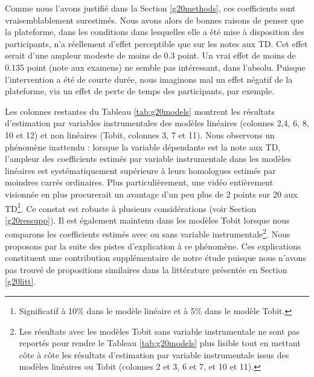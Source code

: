 \documentclass[
]{book}
\begin{document}
Comme nous l'avons justifié dans la Section \ref{g20methods}, ces coefficients sont vraisemblablement surestimés. Nous avons alors de bonnes raisons de penser que la plateforme, dans les conditions dans lesquelles elle a été mise à disposition des participants, n'a réellement d'effet perceptible que sur les notes aux TD. Cet effet serait d'une ampleur modeste de moins de 0.3 point. Un vrai effet de moins de 0.135 point (note aux examens) ne semble pas intéressant, dans l'absolu. Puisque l'intervention a été de courte durée, nous imaginons mal un effet négatif de la plateforme, via un effet de perte de temps des participants, par exemple.

Les colonnes restantes du Tableau \ref{tab:g20models} montrent les résultats d'estimation par variables instrumentales des modèles linéaires (colonnes 2,4, 6, 8, 10 et 12) et non linéaires (Tobit, colonnes 3, 7 et 11). Nous observons un phénomène inattendu : lorsque la variable dépendante est la note aux TD, l'ampleur des coefficients estimés par variable instrumentale dans les modèles linéaires est systématiquement supérieure à leurs homologues estimés par moindres carrés ordinaires. Plus particulièrement, une vidéo entièrement visionnée en plus procurerait un avantage d'un peu plus de 2 points sur 20 aux TD\footnote{Significatif à 10\% dans le modèle linéaire et à 5\% dans le modèle Tobit.}. Ce constat est robuste à plusieurs considérations (voir Section \ref{g20ressupp}). Il est également maintenu dans les modèles Tobit lorsque nous comparons les coefficients estimés avec ou sans variable instrumentale\footnote{Les résultats avec les modèles Tobit sans variable instrumentale ne sont pas reportés pour rendre le Tableau \ref{tab:g20models} plus lisible tout en mettant côte à côte les résultats d'estimation par variable instrumentale issus des modèles linéaires ou Tobit (colonnes 2 et 3, 6 et 7, et 10 et 11).}. Nous proposons par la suite des pistes d'explication à ce phénomène. Ces explications constituent une contribution supplémentaire de notre étude puisque nous n'avons pas trouvé de propositions similaires dans la littérature présentée en Section \ref{g20litt}.
\end{document}
